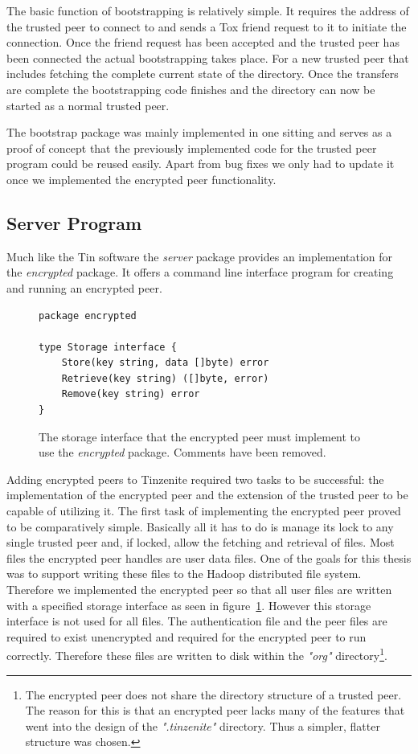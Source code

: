 The basic function of bootstrapping is relatively simple.
It requires the address of the trusted peer to connect to and sends a Tox friend request to it to initiate the connection.
Once the friend request has been accepted and the trusted peer has been connected the actual bootstrapping takes place.
For a new trusted peer that includes fetching the complete current state of the directory.
Once the transfers are complete the bootstrapping code finishes and the directory can now be started as a normal trusted peer.

The bootstrap package was mainly implemented in one sitting and serves as a proof of concept that the previously implemented code for the trusted peer program could be reused easily.
Apart from bug fixes we only had to update it once we implemented the encrypted peer functionality.

\subsection{Server Program}
\label{sub:Server Program}

Much like the Tin software the \emph{server} package provides an implementation for the \emph{encrypted} package.
It offers a command line interface program for creating and running an encrypted peer.

\begin{figure}[htp]
    \begin{lstlisting}[language=golang,firstnumber=0]
package encrypted

type Storage interface {
	Store(key string, data []byte) error
	Retrieve(key string) ([]byte, error)
	Remove(key string) error
}
    \end{lstlisting}
\caption[Encrypted Storage Interface]{The storage interface that the encrypted peer must implement to use the \emph{encrypted} package. Comments have been removed.}
\label{golang:storage_interface}
\end{figure}

Adding encrypted peers to Tinzenite required two tasks to be successful: the implementation of the encrypted peer and the extension of the trusted peer to be capable of utilizing it.
The first task of implementing the encrypted peer proved to be comparatively simple.
Basically all it has to do is manage its lock to any single trusted peer and, if locked, allow the fetching and retrieval of files.
Most files the encrypted peer handles are user data files.
One of the goals for this thesis was to support writing these files to the Hadoop distributed file system.
Therefore we implemented the encrypted peer so that all user files are written with a specified storage interface as seen in figure~\ref{golang:storage_interface}.
However this storage interface is not used for all files.
The authentication file and the peer files are required to exist unencrypted and required for the encrypted peer to run correctly.
Therefore these files are written to disk within the \textit{"org"} directory\footnote{The encrypted peer does not share the directory structure of a trusted peer. The reason for this is that an encrypted peer lacks many of the features that went into the design of the \textit{".tinzenite"} directory. Thus a simpler, flatter structure was chosen.}.

